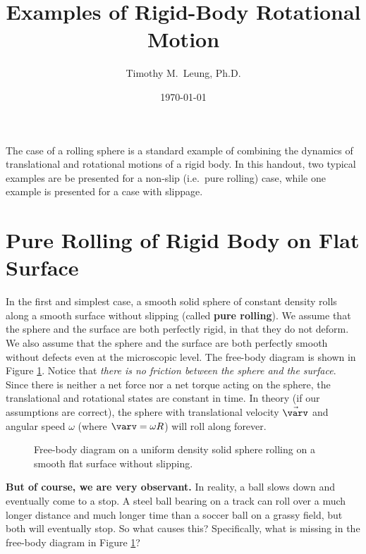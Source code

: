\documentclass{../../oss-handout}
\title{Examples of Rigid-Body Rotational Motion}
\author{Timothy M.\ Leung, Ph.D.}
\date{\today}
\begin{document}
\thispagestyle{title}
\gentitle

The case of a rolling sphere is a standard example of combining the dynamics of
translational and rotational motions of a rigid body. In this handout, two
typical examples are be presented for a non-slip (i.e.\ pure rolling) case,
while one example is presented for a case with slippage.

\section{Pure Rolling of Rigid Body on Flat Surface}
\label{no-slip-ball}
In the first and simplest case, a smooth solid sphere of constant density rolls
along a smooth surface without slipping (called \textbf{pure rolling}). We
assume that the sphere and the surface are both perfectly rigid, in that they
do not deform. We also assume that the sphere and the surface are both
perfectly smooth without defects even at the microscopic level. The free-body
diagram is shown in Figure \ref{roll-flat}. Notice that \emph{there is no
  friction between the sphere and the surface}. Since there is neither a net
force nor a net torque acting on the sphere, the translational and rotational
states are constant in time. In theory (if our assumptions are correct), the
sphere with translational velocity $\vec\varv$ and angular speed $\omega$
(where $\varv=\omega R$) will roll along forever.
\begin{figure}[!ht]
  \centering
  \caption{Free-body diagram on a uniform density solid sphere rolling on a
    smooth flat surface without slipping.}
  \label{roll-flat}
\end{figure}

\textbf{But of course, we are very observant.} In reality, a ball slows down
and eventually come to a stop. A steel ball bearing on a track can roll over a
much longer distance and much longer time than a soccer ball on a grassy field,
but both will eventually stop. So what causes this? Specifically, what is
missing in the free-body diagram in Figure \ref{roll-flat}?
\newpage
\end{document}
